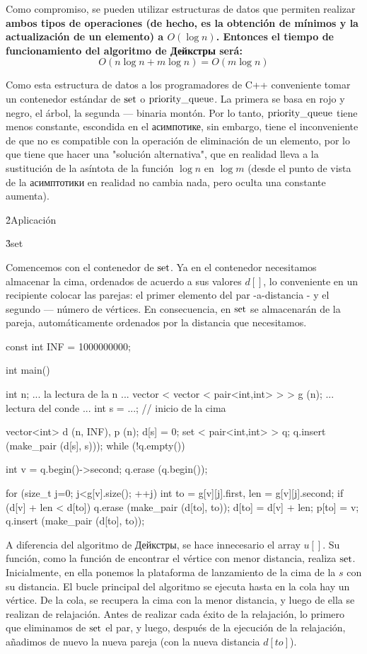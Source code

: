 Como compromiso, se pueden utilizar estructuras de datos que permiten realizar \bf{ambos tipos de operaciones} (de hecho, es la obtención de mínimos y la actualización de un elemento) a $O(\log n)$. Entonces el tiempo de funcionamiento del algoritmo de Дейкстры será:
$$ O(n \log n + m \log n) = O (m \log n) $$

Como esta estructura de datos a los programadores de C++ conveniente tomar un contenedor estándar de $\rm set$ o $\rm priority\_queue$. La primera se basa en rojo y negro, el árbol, la segunda --- binaria montón. Por lo tanto, $\rm priority\_queue$ tiene menos constante, escondida en el асимпотике, sin embargo, tiene el inconveniente de que no es compatible con la operación de eliminación de un elemento, por lo que tiene que hacer una "solución alternativa", que en realidad lleva a la sustitución de la asíntota de la función $\log n$ en $\log m$ (desde el punto de vista de la асимптотики en realidad no cambia nada, pero oculta una constante aumenta).

\h2{Aplicación}

\h3{set}

Comencemos con el contenedor de $\rm set$. Ya en el contenedor necesitamos almacenar la cima, ordenados de acuerdo a sus valores $d[]$, lo conveniente en un recipiente colocar las parejas: el primer elemento del par -a-distancia - y el segundo --- número de vértices. En consecuencia, en $\rm set$ se almacenarán de la pareja, automáticamente ordenados por la distancia que necesitamos.

\code
const int INF = 1000000000;

int main() {
int n;
... la lectura de la n ...
vector < vector < pair<int,int> > > g (n);
... lectura del conde ...
int s = ...; // inicio de la cima

vector<int> d (n, INF), p (n);
d[s] = 0;
set < pair<int,int> > q;
q.insert (make_pair (d[s], s)));
while (!q.empty()) {
int v = q.begin()->second;
q.erase (q.begin());

for (size_t j=0; j<g[v].size(); ++j) {
int to = g[v][j].first,
len = g[v][j].second;
if (d[v] + len < d[to]) {
q.erase (make_pair (d[to], to));
d[to] = d[v] + len;
p[to] = v;
q.insert (make_pair (d[to], to));
}
}
}
}
\endcode

A diferencia del algoritmo de Дейкстры, se hace innecesario el array $u[]$. Su función, como la función de encontrar el vértice con menor distancia, realiza $\rm set$. Inicialmente, en ella ponemos la plataforma de lanzamiento de la cima de la $s$ con su distancia. El bucle principal del algoritmo se ejecuta hasta en la cola hay un vértice. De la cola, se recupera la cima con la menor distancia, y luego de ella se realizan de relajación. Antes de realizar cada éxito de la relajación, lo primero que eliminamos de $\rm set$ el par, y luego, después de la ejecución de la relajación, añadimos de nuevo la nueva pareja (con la nueva distancia $d[to]$).

